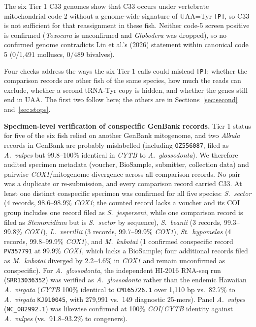 \documentclass[11pt, a4paper]{article}
\begin{document}
The six Tier 1 C33 genomes show that C33 occurs under vertebrate mitochondrial code 2 without a genome-wide signature of UAA=Tyr \texttt{[P]}, so C33 is not sufficient for that reassignment in these fish. Neither code-5 screen positive is confirmed (\textit{Toxocara} is unconfirmed and \textit{Globodera} was dropped), so no confirmed genome contradicts Lin et al.'s (2026) statement within canonical code 5 (0/1,491 molluscs, 0/489 bivalves).

Four checks address the ways the six Tier 1 calls could mislead \texttt{[P]}: whether the comparison records are other fish of the same species, how much the reads can exclude, whether a second tRNA-Tyr copy is hidden, and whether the genes still end in UAA. The first two follow here; the others are in Sections~\ref{sec:second} and~\ref{sec:stops}.

\textbf{Specimen-level verification of conspecific GenBank records.} Tier 1 status for five of the six fish relied on another GenBank mitogenome, and two \textit{Albula} records in GenBank are probably mislabelled (including \texttt{OZ556087}, filed as \textit{A.\ vulpes} but 99.8--100\% identical in \textit{CYTB} to \textit{A.\ glossodonta}). We therefore audited specimen metadata (voucher, BioSample, submitter, collection data) and pairwise \textit{COX1}/mitogenome divergence across all comparison records. No pair was a duplicate or re-submission, and every comparison record carried C33. At least one distinct conspecific specimen was confirmed for all five species: \textit{S.\ sector} (4 records, 98.6--98.9\% \textit{COX1}; the counted record lacks a voucher and its COI group includes one record filed as \textit{S.\ jesperseni}, while one comparison record is filed as \textit{Stemonidium} but is \textit{S.\ sector} by sequence), \textit{S.\ beanii} (3 records, 99.3--99.8\% \textit{COX1}), \textit{L.\ verrillii} (3 records, 99.7--99.9\% \textit{COX1}), \textit{St.\ hypomelas} (4 records, 99.8--99.9\% \textit{COX1}), and \textit{M.\ kubotai} (1 confirmed conspecific record \texttt{PV357791} at 99.9\% \textit{COX1}, which lacks a BioSample; four additional records filed as \textit{M.\ kubotai} diverged by 2.2--4.6\% in \textit{COX1} and remain unconfirmed as conspecific). For \textit{A.\ glossodonta}, the independent HI-2016 RNA-seq run (\texttt{SRR13036352}) was verified as \textit{A.\ glossodonta} rather than the endemic Hawaiian \textit{A.\ virgata} (\textit{CYTB} 100\% identical to \texttt{CM165726.1} over 1,110 bp vs.\ 82.7\% to \textit{A.\ virgata} \texttt{KJ910045}, with 279,991 vs.\ 149 diagnostic 25-mers). Panel \textit{A.\ vulpes} (\texttt{NC\_082992.1}) was likewise confirmed at 100\% \textit{COI}/\textit{CYTB} identity against \textit{A.\ vulpes} (vs.\ 91.8--93.2\% to congeners).
\end{document}
